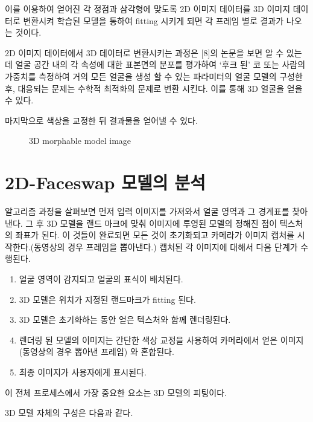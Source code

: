 \documentclass{oblivoir}
\begin{document}
이를 이용하여 얻어진 각 정점과 삼각형에 맞도록 2D 이미지 데이터를 3D 이미지 데이터로 변환시켜 학습된 모델을 통하여 fitting 시키게 되면 각 프레임 별로 결과가 나오는 것이다.

2D 이미지 데이터에서 3D 데이터로 변환시키는 과정은 [8]의 논문을 보면 알 수 있는데 
얼굴 공간 내의 각 속성에 대한 표본면의 분포를 평가하여 ‘후크 된’ 코 또는 사람의 가중치를 측정하여 거의 모든 얼굴을 생성 할 수 있는 파라미터의 얼굴 모델의 구성한 후, 대응되는 문제는 수학적 최적화의 문제로 변환 시킨다. 이를 통해 3D 얼굴을 얻을 수 있다.

마지막으로 색상을 교정한 뒤 결과물을 얻어낼 수 있다.

\begin{figure}[h!]
\centering
\caption{ 3D morphable model image\cite{reference7}}
\end{figure}


\section{2D-Faceswap 모델의 분석}

알고리즘 과정을 살펴보면 먼저 입력 이미지를 가져와서 얼굴 영역과 그 경계표를 찾아낸다. 그 후 3D 모델을 랜드 마크에 맞춰 이미지에 투영된 모델의 정해진 점이 텍스처의 좌표가 된다. 이 것들이 완료되면 모든 것이 초기화되고 카메라가 이미지 캡처를 시작한다.(동영상의 경우 프레임을 뽑아낸다.) 캡처된 각 이미지에 대해서 다음 단계가 수행된다.

\begin{enumerate}
    \item 얼굴 영역이 감지되고 얼굴의 표식이 배치된다.
    \item 3D 모델은 위치가 지정된 랜드마크가 fitting 된다.
    \item 3D 모델은 초기화하는 동안 얻은 텍스처와 함께 렌더링된다.
    \item 렌더링 된 모델의 이미지는 간단한 색상 교정을 사용하여 카메라에서 얻은 이미지(동영상의 경우 뽑아낸 프레임) 와 혼합된다.
    \item 최종 이미지가 사용자에게 표시된다.
\end{enumerate}

이 전체 프로세스에서 가장 중요한 요소는 3D 모델의 피팅이다. 

3D 모델 자체의 구성은 다음과 같다.
\end{document}
